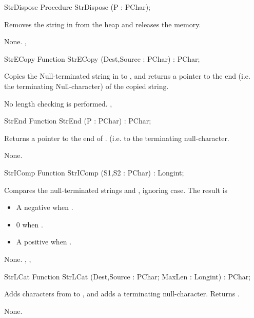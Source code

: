 \html{}
\begin{procedure}{StrDispose}
\Declaration
Procedure StrDispose (P : PChar);

\Description

Removes the string in  from the heap and releases the memory.

\Errors
None.
\SeeAlso
{}, 
\end{procedure}
\latex{}
\html{}
\begin{function}{StrECopy}
\Declaration
Function StrECopy (Dest,Source : PChar) : PChar;

\Description

Copies the Null-terminated string in  to , and
returns a pointer to the end (i.e. the terminating Null-character) of the
copied string.

\Errors
No length checking is performed.
\SeeAlso
{}, 
\end{function}
\latex{}
\html{}
\begin{function}{StrEnd}
\Declaration
Function StrEnd (P : PChar) : PChar;

\Description

Returns a pointer to the end of . (i.e. to the terminating
null-character.

\Errors
None.
\SeeAlso
{}
\end{function}
\latex{}
\html{}
\begin{function}{StrIComp}
\Declaration
Function StrIComp (S1,S2 : PChar) : Longint;

\Description

Compares the null-terminated strings  and , ignoring case.
The result is 
\begin{itemize}
\item A negative  when .
\item 0 when .
\item A positive  when .
\end{itemize}

\Errors
None.
\SeeAlso
{}, , 
\end{function}
\latex{}
\html{}
\begin{function}{StrLCat}
\Declaration
Function StrLCat (Dest,Source : PChar; MaxLen : Longint) : PChar;

\Description

Adds  characters from  to , and adds a
terminating null-character. Returns .

\Errors
None.
\SeeAlso
{}
\end{function}
